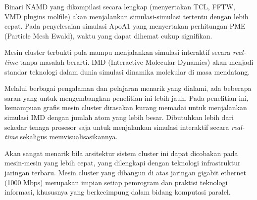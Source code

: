 \documentclass[aps,showpacs,pre,floatfix]{revtex4}
\begin{document}
Binari NAMD yang dikompilasi secara lengkap (menyertakan TCL,
FFTW, VMD plugins molfile) akan menjalankan simulasi-simulasi
tertentu dengan lebih cepat. Pada penyelesaian simulasi  ApoA1
yang menyertakan perhitungan PME (Particle Mesh Ewald), waktu yang
dapat dihemat cukup signifikan.

Mesin cluster terbukti pula mampu menjalankan simulasi interaktif
secara \textit{real-time} tanpa masalah berarti. IMD (Interactive
Molecular Dynamics) akan menjadi standar teknologi dalam dunia
simulasi dinamika molekular di masa mendatang.

Melalui berbagai pengalaman dan pelajaran menarik yang dialami,
ada beberapa saran yang untuk mengembangkan penelitian ini lebih
jauh. Pada penelitian ini, kemampuan grafis mesin cluster
dirasakan kurang memadai untuk menjalankan simulasi IMD dengan
jumlah atom yang lebih besar. Dibutuhkan lebih dari sekedar tenaga
prosesor saja untuk menjalankan simulasi interaktif secara
\textit{real-time} sekaligus memvisualisasikannya.

Akan sangat menarik bila arsitektur sistem cluster ini dapat
dicobakan pada mesin-mesin yang lebih cepat, yang dilengkapi
dengan teknologi infrastruktur jaringan terbaru. Mesin cluster
yang dibangun di atas jaringan gigabit ethernet (1000 Mbps)
merupakan impian setiap pemrogram dan praktisi teknologi
informasi, khususnya yang berkecimpung dalam bidang komputasi
paralel.
\end{document}
